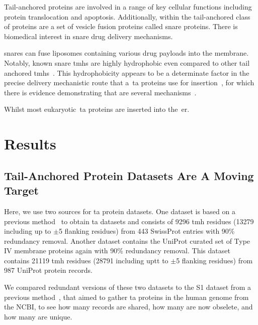 Tail-anchored proteins are involved in a range of key cellular functions including protein translocation and apoptosis.
Additionally, within the tail-anchored class of proteins are a set of vesicle fusion proteins called \gls{snare} proteins.
There is biomedical interest in \gls{snare} drug delivery mechanisms.

\gls{snare}s can fuse liposomes containing various drug payloads into the membrane.
Notably, known \gls{snare} \gls{tmh}s are highly hydrophobic even compared to other tail anchored \gls{tmh}s~\cite{Kalbfleisch2007}.
This hydrophobicity appears to be a determinate factor in the precise delivery mechanistic route that a~\gls{ta} proteins use for insertion~\cite{Rabu2008, Rabu2009}, for which there is evidence demonstrating that are several mechanisms~\cite{Rabu2009, Johnson2013}.

Whilst most eukaryotic~\gls{ta} proteins are inserted into the~\gls{er}.

\section{Results}

\subsection{Tail-Anchored Protein Datasets Are A Moving Target}
Here, we use two sources for \gls{ta} protein datasets.
One dataset is based on a previous method~\cite{Kalbfleisch2007} to obtain \gls{ta} datasets and consists of 9296 \gls{tmh} residues (13279 including up to $\pm$5 flanking residues) from 443 SwissProt entries with 90\% redundancy removal.
Another dataset contains the UniProt curated set of Type IV membrane proteins again with 90\% redundancy removal.
This dataset contains 21119 \gls{tmh} residues (28791 including uptt to $\pm$5 flanking residues) from 987 UniProt protein records.

We compared redundant versions of these two datasets to the S1 dataset from a previous method~\cite{Kalbfleisch2007}, that aimed to gather \gls{ta} proteins in the human genome from the NCBI, to see how many records are shared, how many are now obselete, and how many are unique.

